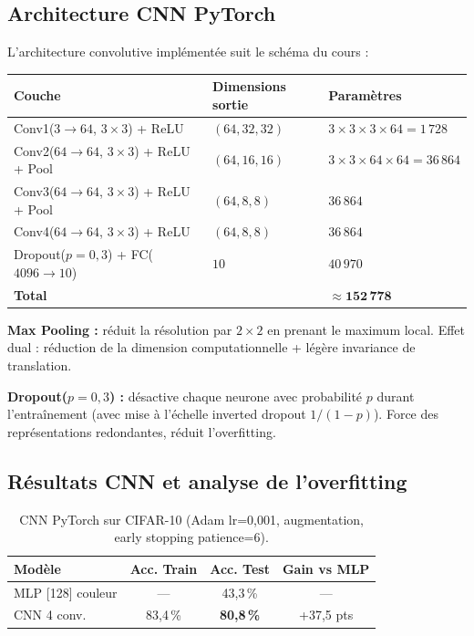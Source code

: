 \documentclass[a4paper,11pt]{article}
\begin{document}
\subsection{Architecture CNN PyTorch}

L'architecture convolutive implémentée suit le schéma du cours :

\begin{center}
\begin{tabular}{lll}
\toprule
\textbf{Couche} & \textbf{Dimensions sortie} & \textbf{Paramètres} \\
\midrule
Conv1($3\to64$, $3\times3$) + ReLU         & $(64, 32, 32)$ & $3\times3\times3\times64 = 1\,728$ \\
Conv2($64\to64$, $3\times3$) + ReLU + Pool & $(64, 16, 16)$ & $3\times3\times64\times64 = 36\,864$ \\
Conv3($64\to64$, $3\times3$) + ReLU + Pool & $(64, 8, 8)$   & $36\,864$ \\
Conv4($64\to64$, $3\times3$) + ReLU        & $(64, 8, 8)$   & $36\,864$ \\
Dropout($p=0{,}3$) + FC($4096\to10$)       & $10$           & $40\,970$ \\
\midrule
\textbf{Total}                              &               & $\mathbf{\approx 152\,778}$ \\
\bottomrule
\end{tabular}
\end{center}

\textbf{Max Pooling :} réduit la résolution par $2\times2$ en prenant le maximum local.
Effet dual : réduction de la dimension computationnelle + légère invariance de translation.

\textbf{Dropout($p=0{,}3$) :} désactive chaque neurone avec probabilité $p$ durant
l'entraînement (avec mise à l'échelle inverted dropout $1/(1-p)$).
Force des représentations redondantes, réduit l'overfitting.

\subsection{Résultats CNN et analyse de l'overfitting}

\begin{table}[H]
\centering
\caption{CNN PyTorch sur CIFAR-10 (Adam lr=0{,}001, augmentation, early stopping patience=6).}
\begin{tabular}{lccc}
\toprule
\textbf{Modèle} & \textbf{Acc. Train} & \textbf{Acc. Test} & \textbf{Gain vs MLP} \\
\midrule
MLP [128] couleur & — & 43{,}3\,\% & — \\
CNN 4 conv.       & 83{,}4\,\% & \textbf{80{,}8\,\%} & +37{,}5 pts \\
\bottomrule
\end{tabular}
\label{tab:cifar_cnn}
\end{table}
\end{document}
